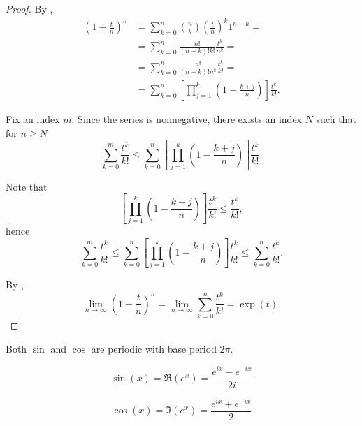 \begin{proof}
  \cite[3.31]{Rudin1991} By ,
  \begin{align*}
    \left(1 + \frac t n \right)^n
    &=
    \sum_{k=0}^n \binom{n}{k} \left(\frac t n\right)^k 1^{n-k}
    = \\ &=
    \sum_{k=0}^n \frac {n!} {(n-k)! k!} \frac {t^k} {n^k}
    = \\ &=
    \sum_{k=0}^n \frac {n!} {(n-k)! n^k} \frac {t^k} {k!}
    = \\ &=
    \sum_{k=0}^n \left[ \prod_{j=1}^k \left(1 - \frac {k+j} n \right) \right] \frac {t^k} {k!}.
  \end{align*}

  Fix an index \( m \). Since the series is nonnegative, there exists an index \( N \) such that for \( n \geq N \)
  \begin{equation*}
    \sum_{k=0}^m \frac {t^k} {k!}
    \leq
    \sum_{k=0}^n \left[ \prod_{j=1}^k \left(1 - \frac {k+j} n \right) \right] \frac {t^k} {k!}.
  \end{equation*}

  Note that
  \begin{equation*}
    \left[ \prod_{j=1}^k \left(1 - \frac {k+j} n \right) \right] \frac {t^k} {k!}
    \leq
    \frac {t^k} {k!},
  \end{equation*}
  hence
  \begin{equation*}
    \sum_{k=0}^m \frac {t^k} {k!}
    \leq
    \sum_{k=0}^n \left[ \prod_{j=1}^k \left(1 - \frac {k+j} n \right) \right] \frac {t^k} {k!}
    \leq
    \sum_{k=0}^n \frac {t^k} {k!}.
  \end{equation*}

  By ,
  \begin{equation*}
    \lim_{n \to \infty} \left(1 + \frac t n \right)^n
    =
    \lim_{n \to \infty} \sum_{k=0}^n \frac {t^k} {k!}
    =
    \exp(t).
  \end{equation*}
\end{proof}

\begin{corollary}\label{thm:trigonometric_function_properties}
  \mbox{}
  \begin{thmenum}
     Both \( \sin \) and \( \cos \) are periodic with base period \( 2\pi \).

    \begin{equation*}
       \sin(x) = \Re(e^x) = \frac {e^{ix} - e^{-ix}} {2i}
    \end{equation*}

    \begin{equation*}
       \cos(x) = \Im(e^x) = \frac {e^{ix} + e^{-ix}} 2
    \end{equation*}
  \end{thmenum}
\end{corollary}

